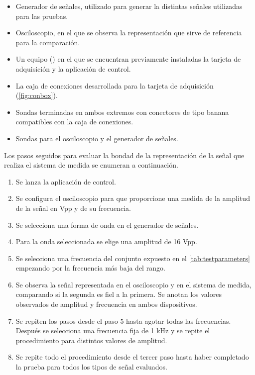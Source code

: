 \begin{itemize}
    \item Generador de señales, utilizado para generar la distintas señales
	utilizadas para las pruebas.
    \item Osciloscopio, en el que se observa la representación que sirve de
	referencia para la comparación.
    \item Un equipo (\pc{}) en el que se encuentran previamente instaladas
	la tarjeta de adquisición y la aplicación de control.
    \item La caja de conexiones desarrollada para la tarjeta de
	adquisición (\vref{fig:conbox}).
    \item Sondas terminadas en ambos extremos con conectores de tipo banana
	compatibles con la caja de conexiones.
    \item Sondas para el osciloscopio y el generador de señales.
\end{itemize}

Los pasos seguidos para evaluar la bondad de la representación de la señal
que realiza el sistema de medida se enumeran a continuación.

\begin{enumerate}
    \item Se lanza la aplicación de control.
    \item Se configura el osciloscopio para que proporcione una medida de
	la amplitud de la señal en Vpp y de su frecuencia.
    \item Se selecciona una forma de onda en el generador de señales.
    \item Para la onda seleccionada se elige una amplitud de 16 Vpp.
    \item Se selecciona una frecuencia del conjunto expuesto en el
	\cref{tab:testparameters} empezando por la frecuencia más baja del
	rango.
    \item Se observa la señal representada en el osciloscopio y en el
	sistema de medida, comparando si la segunda es fiel a la primera.
	Se anotan los valores observados de amplitud y frecuencia en ambos
	dispositivos.
    \item Se repiten los pasos desde el paso 5 hasta agotar todas las
	frecuencias. Después se selecciona una frecuencia fija de 1 kHz y
	se repite el procedimiento para distintos valores de amplitud.
    \item Se repite todo el procedimiento desde el tercer paso hasta haber
	completado la prueba para todos los tipos de señal evaluados.
\end{enumerate}

